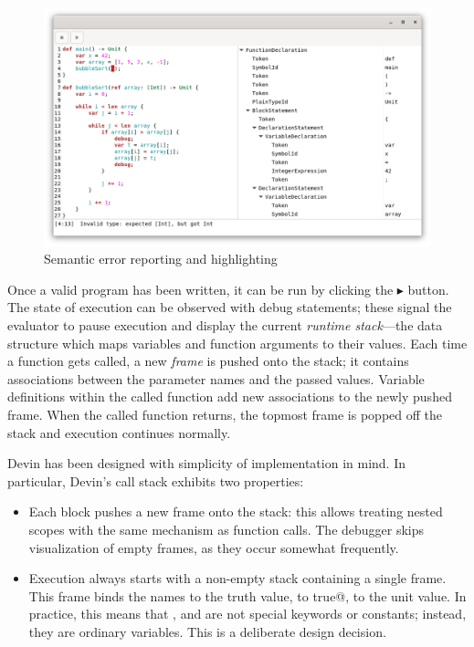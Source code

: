\documentclass[UdineBachThesis,american,11pt,draft]{PhdThesis}
\begin{document}
  \begin{figure}[h]
    \centering
    \includegraphics[width=\textwidth]{4.png}
    \caption{Semantic error reporting and highlighting}
  \end{figure}

  Once a valid program has been written, it can be run by clicking the
  $\blacktriangleright$ button. The state of execution can be observed with
  debug statements; these signal the evaluator to pause execution and display
  the current \emph{runtime stack}---the data structure which maps variables and
  function arguments to their values. Each time a function gets called, a new
  \emph{frame} is pushed onto the stack; it contains associations between the
  parameter names and the passed values. Variable definitions within the called
  function add new associations to the newly pushed frame. When the called
  function returns, the topmost frame is popped off the stack and execution
  continues normally.

  Devin has been designed with simplicity of implementation in mind. In
  particular, Devin's call stack exhibits two properties:

  \begin{itemize}
    \item Each block pushes a new frame onto the stack: this allows treating
    nested scopes with the same mechanism as function calls. The debugger skips
    visualization of empty frames, as they occur somewhat frequently.

    \item Execution always starts with a non-empty stack containing a single
    frame. This frame binds the names \lstinline@true@ to the truth value,
    \lstinline@false@ to \lstinline@not true@, \lstinline@unit@ to the unit
    value. In practice, this means that \lstinline@true@, \lstinline@false@ and
    \lstinline@unit@ are not special keywords or constants; instead, they are
    ordinary variables. This is a deliberate design decision.
  \end{itemize}
\end{document}
